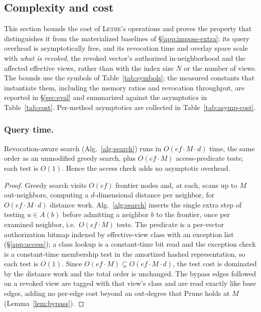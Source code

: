 \documentclass[sigconf, nonacm, review]{acmart}
\begin{document}
\subsection{Complexity and cost}
\label{app:cost}

This section bounds the cost of \textsc{Lethe}'s operations and proves the
property that distinguishes it from the materialized baselines of
\S\ref{app:imposs-extra}: its query overhead is asymptotically free, and its
revocation time and overlay space scale with \emph{what is revoked}, the
revoked vector's authorized in-neighborhood and the affected effective views, rather than with the index size $N$ or the number of views. The bounds use
the symbols of Table~\ref{tab:symbols}; the measured constants that instantiate
them, including the memory ratios and revocation throughput, are reported in
\S\ref{sec:eval} and summarized against the asymptotics in
Table~\ref{tab:cost}. Per-method asymptotics are collected in
Table~\ref{tab:asymp-cost}.

\subsubsection{Query time.}
\label{app:cost-query}
\begin{proposition}
\label{prop:query-cost}
Revocation-aware search (Alg.~\ref{alg:search}) runs in
$O(\mathit{ef}\cdot M\cdot d)$ time, the same order as an unmodified greedy
search, plus $O(\mathit{ef}\cdot M)$ access-predicate tests; each test is
$O(1)$. Hence the access check adds no asymptotic overhead.
\end{proposition}
\begin{proof}
Greedy search visits $O(\mathit{ef})$ frontier nodes and, at each, scans up to
$M$ out-neighbors, computing a $d$-dimensional distance per neighbor, for
$O(\mathit{ef}\cdot M\cdot d)$ distance work. Alg.~\ref{alg:search} inserts the
single extra step of testing $u\in A(b)$ before admitting a neighbor $b$ to the
frontier, once per examined neighbor, i.e.\ $O(\mathit{ef}\cdot M)$ tests. The
predicate is a per-vector authorization bitmap indexed by effective-view class
with an exception list (\S\ref{app:access}); a class lookup is a constant-time
bit read and the exception check is a constant-time membership test in the
amortized hashed representation, so each test is $O(1)$. Since
$O(\mathit{ef}\cdot M)\subseteq O(\mathit{ef}\cdot M\cdot d)$, the test cost is
dominated by the distance work and the total order is unchanged. The bypass
edges followed on a revoked view are tagged with that view's class and are read
exactly like base edges, adding no per-edge cost beyond an out-degree that
$\mathrm{Prune}$ holds at $M$ (Lemma~\ref{lem:bypass}).
\end{proof}
\end{document}
